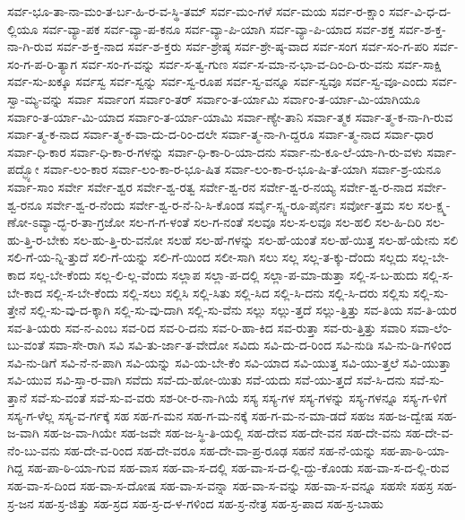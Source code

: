 {ಸರ್ವ-ಭೂ-ತಾ-ನಾ-ಮಂ-ತ-ರ್ಬ-ಹಿ-ರ-ವ-ಸ್ಥಿ-ತಮ್
ಸರ್ವ-ಮಂ-ಗಳೆ
ಸರ್ವ-ಮಯ
ಸರ್ವ-ರ-ಕ್ಷಾಂ
ಸರ್ವ-ವಿ-ಧ-ದ-ಲ್ಲಿಯೂ
ಸರ್ವ-ವ್ಯಾ-ಪಕ
ಸರ್ವ-ವ್ಯಾ-ಪ-ಕನೂ
ಸರ್ವ-ವ್ಯಾ-ಪಿ-ಯಾಗಿ
ಸರ್ವ-ವ್ಯಾ-ಪಿ-ಯಾದ
ಸರ್ವ-ಶಕ್ತ
ಸರ್ವ-ಶ-ಕ್ತ-ನಾ-ಗಿ-ರುವ
ಸರ್ವ-ಶ-ಕ್ತ-ನಾದ
ಸರ್ವ-ಶ-ಕ್ತರು
ಸರ್ವ-ಶ್ರೇಷ್ಠ
ಸರ್ವ-ಶ್ರೇ-ಷ್ಠ-ವಾದ
ಸರ್ವ-ಸಂಗ
ಸರ್ವ-ಸಂ-ಗ-ಪರಿ
ಸರ್ವ-ಸಂ-ಗ-ಪ-ರಿ-ತ್ಯಾಗ
ಸರ್ವ-ಸಂ-ಗ-ವನ್ನು
ಸರ್ವ-ಸ-ತ್ವ-ಗುಣ
ಸರ್ವ-ಸ-ಮಾ-ನ-ಭಾ-ವ-ದಿಂ-ದಿ-ರು-ವನು
ಸರ್ವ-ಸಾಕ್ಷಿ
ಸರ್ವ-ಸು-ಖಕ್ಕೂ
ಸರ್ವಸ್ವ
ಸರ್ವ-ಸ್ವನ್ನು
ಸರ್ವ-ಸ್ವ-ರೂಪ
ಸರ್ವ-ಸ್ವ-ವನ್ನೂ
ಸರ್ವ-ಸ್ವವೂ
ಸರ್ವ-ಸ್ವ-ವೂ-ಎಂದು
ಸರ್ವ-ಸ್ವಾ-ಮ್ಯ-ವನ್ನು
ಸರ್ವಾ
ಸರ್ವಾಂಗ
ಸರ್ವಾಂ-ತರ್
ಸರ್ವಾಂ-ತ-ರ್ಯಾಮಿ
ಸರ್ವಾಂ-ತ-ರ್ಯಾ-ಮಿ-ಯಾಗಿಯೂ
ಸರ್ವಾಂ-ತ-ರ್ಯಾ-ಮಿ-ಯಾದ
ಸರ್ವಾಂ-ತ-ರ್ಯಾ-ಯಾಮಿ
ಸರ್ವಾ-ಣ್ಯೇ-ತಾನಿ
ಸರ್ವಾ-ತ್ಮಕ
ಸರ್ವಾ-ತ್ಮ-ಕ-ನಾ-ಗಿ-ರುವ
ಸರ್ವಾ-ತ್ಮ-ಕ-ನಾದ
ಸರ್ವಾ-ತ್ಮ-ಕ-ವಾ-ದು-ದ-ರಿಂ-ದಲೇ
ಸರ್ವಾ-ತ್ಮ-ನಾ-ಗಿ-ದ್ದರೂ
ಸರ್ವಾ-ತ್ಮ-ನಾದ
ಸರ್ವಾ-ಧಾರ
ಸರ್ವಾ-ಧಿ-ಕಾರ
ಸರ್ವಾ-ಧಿ-ಕಾ-ರ-ಗಳನ್ನು
ಸರ್ವಾ-ಧಿ-ಕಾ-ರಿ-ಯಾ-ದನು
ಸರ್ವಾ-ನು-ಕೂ-ಲೆ-ಯಾ-ಗಿ-ರು-ವಳು
ಸರ್ವಾ-ಪದ್ಭ್ಯೋ
ಸರ್ವಾ-ಲಂ-ಕಾರ
ಸರ್ವಾ-ಲಂ-ಕಾ-ರ-ಭೂ-ಷಿತ
ಸರ್ವಾ-ಲಂ-ಕಾ-ರ-ಭೂ-ಷಿ-ತೆ-ಯಾಗಿ
ಸರ್ವಾ-ಶ್ರ-ಯನೂ
ಸರ್ವಾ-ಸಾಂ
ಸರ್ವೇ
ಸರ್ವೇ-ಶ್ವರ
ಸರ್ವೇ-ಶ್ವ-ರತ್ವ
ಸರ್ವೇ-ಶ್ವ-ರನ
ಸರ್ವೇ-ಶ್ವ-ರ-ನಯ್ಯ
ಸರ್ವೇ-ಶ್ವ-ರ-ನಾದ
ಸರ್ವೇ-ಶ್ವ-ರನೂ
ಸರ್ವೇ-ಶ್ವ-ರ-ನೆಂದು
ಸರ್ವೇ-ಶ್ವ-ರ-ನೆ-ನಿ-ಸಿ-ಕೊಂಡ
ಸರ್ವೈ-ಸ್ಸ್ವ-ರೂ-ಪೈರ್ನಃ
ಸರ್ವೋ-ತ್ತಮ
ಸಲ
ಸಲ-ಕ್ಷ್ಮ-ಣೋ-ಽವ್ಯಾ-ದ್ಭ-ರ-ತಾ-ಗ್ರಜೋ
ಸಲ-ಗ-ಗ-ಳಂತೆ
ಸಲ-ಗ-ನಂತೆ
ಸಲವೂ
ಸಲ-ಸ-ಲವೂ
ಸಲ-ಹಲಿ
ಸಲ-ಹಿ-ದಿರಿ
ಸಲ-ಹು-ತ್ತಿ-ರ-ಬೇಕು
ಸಲ-ಹು-ತ್ತಿ-ರು-ವನೋ
ಸಲಹೆ
ಸಲ-ಹೆ-ಗಳನ್ನು
ಸಲ-ಹೆ-ಯಂತೆ
ಸಲ-ಹೆ-ಯಿತ್ತ
ಸಲ-ಹೆ-ಯೇನು
ಸಲಿ
ಸಲಿ-ಗೆ-ಯ-ನ್ನಿ-ತ್ತುದೆ
ಸಲಿ-ಗೆ-ಯನ್ನು
ಸಲಿ-ಗೆ-ಯಿಂದ
ಸಲೀ-ಸಾಗಿ
ಸಲು
ಸಲ್ಲ
ಸಲ್ಲ-ತ-ಕ್ಕು-ದೆಂದು
ಸಲ್ಲದು
ಸಲ್ಲ-ಬೇ-ಕಾದ
ಸಲ್ಲ-ಬೇ-ಕೆಂದು
ಸಲ್ಲ-ಲಿ-ಲ್ಲ-ವೆಂದು
ಸಲ್ಲಾಪ
ಸಲ್ಲಾ-ಪ-ದಲ್ಲಿ
ಸಲ್ಲಾ-ಪ-ಮಾ-ಡುತ್ತಾ
ಸಲ್ಲಿ-ಸ-ಬ-ಹುದು
ಸಲ್ಲಿ-ಸ-ಬೇ-ಕಾದ
ಸಲ್ಲಿ-ಸ-ಬೇ-ಕೆಂದು
ಸಲ್ಲಿ-ಸಲು
ಸಲ್ಲಿಸಿ
ಸಲ್ಲಿ-ಸಿತು
ಸಲ್ಲಿ-ಸಿದ
ಸಲ್ಲಿ-ಸಿ-ದನು
ಸಲ್ಲಿ-ಸಿ-ದರು
ಸಲ್ಲಿಸು
ಸಲ್ಲಿ-ಸು-ತ್ತೇನೆ
ಸಲ್ಲಿ-ಸು-ವು-ದ-ಕ್ಕಾಗಿ
ಸಲ್ಲಿ-ಸು-ವು-ದಾಗಿ
ಸಲ್ಲಿ-ಸು-ವೆನು
ಸಲ್ಲು
ಸಲ್ಲು-ತ್ತದೆ
ಸಲ್ಲು-ತ್ತಿತ್ತು
ಸವ-ತಿಯ
ಸವ-ತಿ-ಯರ
ಸವ-ತಿ-ಯರು
ಸವ-ನ-ಎಂಬ
ಸವ-ರಿದ
ಸವ-ರಿ-ದನು
ಸವ-ರಿ-ಹಾ-ಕಿದ
ಸವ-ರುತ್ತಾ
ಸವ-ರು-ತ್ತಿತ್ತು
ಸವಾರಿ
ಸವಾ-ಲೆಂ-ಬು-ವಂತೆ
ಸವಾ-ಸೇ-ರಾಗಿ
ಸವಿ
ಸವಿ-ತು-ರ್ಜಾ-ತ-ವೇದೋ
ಸವಿದು
ಸವಿ-ದು-ದ-ರಿಂದ
ಸವಿ-ನುಡಿ
ಸವಿ-ನು-ಡಿ-ಗಳಿಂದ
ಸವಿ-ನು-ಡಿಗೆ
ಸವಿ-ನೆ-ನ-ಪಾಗಿ
ಸವಿ-ಯನ್ನು
ಸವಿ-ಯ-ಬೇ-ಕೆಂ
ಸವಿ-ಯಾದ
ಸವಿ-ಯುತ್ತ
ಸವಿ-ಯು-ತ್ತಲೆ
ಸವಿ-ಯುತ್ತಾ
ಸವಿ-ಯುವ
ಸವಿ-ಸ್ತಾ-ರ-ವಾಗಿ
ಸವೆದು
ಸವೆ-ದು-ಹೋ-ಯಿತು
ಸವೆ-ಯದು
ಸವೆ-ಯು-ತ್ತದೆ
ಸವೆ-ಸಿ-ದನು
ಸವೆ-ಸು-ತ್ತಾನೆ
ಸವೆ-ಸು-ವಂತೆ
ಸವೆ-ಸು-ವ-ವರು
ಸಶ-ರೀ-ರ-ನಾ-ಗಿಯೆ
ಸಸ್ಯ
ಸಸ್ಯ-ಗಳ
ಸಸ್ಯ-ಗಳನ್ನು
ಸಸ್ಯ-ಗಳನ್ನೂ
ಸಸ್ಯ-ಗ-ಳಿಗೆ
ಸಸ್ಯ-ಗ-ಳೆಲ್ಲ
ಸಸ್ಯ-ವ-ರ್ಗಕ್ಕೆ
ಸಹ
ಸಹ-ಗ-ಮನ
ಸಹ-ಗ-ಮ-ನಕ್ಕೆ
ಸಹ-ಗ-ಮ-ನ-ಮಾ-ಡದೆ
ಸಹಜ
ಸಹ-ಜ-ದ್ವೇಷ
ಸಹ-ಜ-ವಾಗಿ
ಸಹ-ಜ-ವಾ-ಗಿಯೇ
ಸಹ-ಜವೇ
ಸಹ-ಜ-ಸ್ಥಿ-ತಿ-ಯಲ್ಲಿ
ಸಹ-ದೇವ
ಸಹ-ದೇ-ವನ
ಸಹ-ದೇ-ವನು
ಸಹ-ದೇ-ವ-ನೆಂ-ಬು-ವನು
ಸಹ-ದೇ-ವ-ರಿಂದ
ಸಹ-ದೇ-ವರೂ
ಸಹ-ದೇ-ವಾ-ಪ್ರ-ರೂಢ
ಸಹನೆ
ಸಹ-ನೆ-ಯನ್ನು
ಸಹ-ಪಾ-ಠಿ-ಯಾ-ಗಿದ್ದ
ಸಹ-ಪಾ-ಠಿ-ಯಾ-ಗುವ
ಸಹ-ವಾಸ
ಸಹ-ವಾ-ಸ-ದಲ್ಲಿ
ಸಹ-ವಾ-ಸ-ದ-ಲ್ಲಿ-ದ್ದು-ಕೊಂಡು
ಸಹ-ವಾ-ಸ-ದ-ಲ್ಲಿ-ರುವ
ಸಹ-ವಾ-ಸ-ದಿಂದ
ಸಹ-ವಾ-ಸ-ದೋಷ
ಸಹ-ವಾ-ಸ-ವನ್ನಾ
ಸಹ-ವಾ-ಸ-ವನ್ನು
ಸಹ-ವಾ-ಸ-ವನ್ನೂ
ಸಹಸೇ
ಸಹಸ್ರ
ಸಹ-ಸ್ರ-ಜನ
ಸಹ-ಸ್ರ-ಜಿತ್ತು
ಸಹ-ಸ್ರದ
ಸಹ-ಸ್ರ-ದ-ಳ-ಗಳಿಂದ
ಸಹ-ಸ್ರ-ನೇತ್ರ
ಸಹ-ಸ್ರ-ಪಾದ
ಸಹ-ಸ್ರ-ಬಾಹು
}
